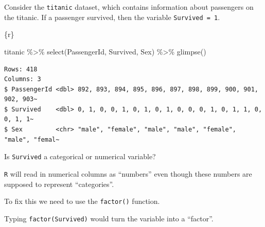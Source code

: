 \documentclass[
  letterpaper,
  DIV=11,
  numbers=noendperiod]{scrreprt}
\newenvironment{Shaded}{\begin{snugshade}}{\end{snugshade}}
\newcommand{\FunctionTok}[1]{\textcolor[rgb]{0.28,0.35,0.67}{#1}}
\newcommand{\InformationTok}[1]{\textcolor[rgb]{0.37,0.37,0.37}{#1}}
\newcommand{\NormalTok}[1]{\textcolor[rgb]{0.00,0.23,0.31}{#1}}
\newcommand{\SpecialCharTok}[1]{\textcolor[rgb]{0.37,0.37,0.37}{#1}}
\begin{document}
\begin{tcolorbox}[enhanced jigsaw, colframe=quarto-callout-note-color-frame, breakable, colback=white, toprule=.15mm, leftrule=.75mm, left=2mm, opacityback=0, rightrule=.15mm, arc=.35mm, bottomrule=.15mm]
Consider the \texttt{titanic} dataset, which contains information about
passengers on the titanic. If a passenger survived, then the variable
\texttt{Survived\ =\ 1}.

\begin{Shaded}
\begin{Highlighting}[]
\InformationTok{\textasciigrave{}\textasciigrave{}\textasciigrave{}\{r\}}

\NormalTok{titanic }\SpecialCharTok{\%\textgreater{}\%} 
  \FunctionTok{select}\NormalTok{(PassengerId, Survived, Sex) }\SpecialCharTok{\%\textgreater{}\%}
  \FunctionTok{glimpse}\NormalTok{()}
\InformationTok{\textasciigrave{}\textasciigrave{}\textasciigrave{}}
\end{Highlighting}
\end{Shaded}

\begin{verbatim}
Rows: 418
Columns: 3
$ PassengerId <dbl> 892, 893, 894, 895, 896, 897, 898, 899, 900, 901, 902, 903~
$ Survived    <dbl> 0, 1, 0, 0, 1, 0, 1, 0, 1, 0, 0, 0, 1, 0, 1, 1, 0, 0, 1, 1~
$ Sex         <chr> "male", "female", "male", "male", "female", "male", "femal~
\end{verbatim}

Is \texttt{Survived} a categorical or numerical variable?

\texttt{R} will read in numerical columns as ``numbers'' even though
these numbers are supposed to represent ``categories''.

To fix this we need to use the \texttt{factor()} function.

Typing \texttt{factor(Survived)} would turn the variable into a
``factor''.
\end{tcolorbox}
\end{document}
